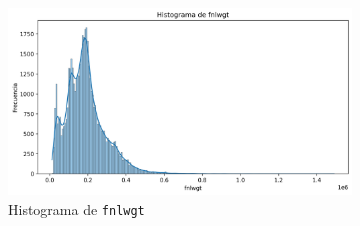 \documentclass[12pt,a4paper]{article}
\begin{document}
\begin{enumerate}
    \begin{figure}[H]
      \centering
      \begin{subfigure}[b]{0.45\textwidth}
        \includegraphics[width=\textwidth]{histogram_fnlwgt.png}
        \caption{Histograma de \texttt{fnlwgt}}
        \label{fig:fnlwgt_hist}
      \end{subfigure}
      \hfill
      \begin{subfigure}[b]{0.45\textwidth}

\end{subfigure}
\end{figure}
\end{enumerate}
\end{document}
